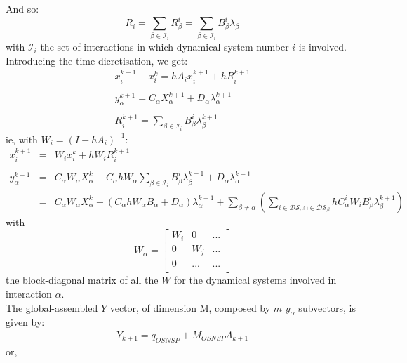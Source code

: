 \documentclass[10pt]{report}
\begin{document}
And so: 
\begin{equation}
R_i = \sum_{\beta\in\mathcal{I}_i}R_{\beta}^i=\sum_{\beta\in\mathcal{I}_i}B^i_{\beta} \lambda_{\beta}
\end{equation}
with $\mathcal{I}_i$ the set of interactions in which dynamical system number $i$ is involved. \\
Introducing the time dicretisation, we get: 
\begin{eqnarray}
x_i^{k+1}-x_i^k = h A_i x_i^{k+1} + h R_i^{k+1}  \\
\nonumber\\
y_{\alpha}^{k+1} = C_{\alpha}X_{\alpha}^{k+1} + D_{\alpha}\lambda_{\alpha}^{k+1}\\
\nonumber\\
R_i^{k+1} = \sum_{\beta\in\mathcal{I}_i}B^i_{\beta} \lambda_{\beta}^{k+1}
\end{eqnarray}
ie, with $W_i = (I-h A_i)^{-1}$: 
\begin{eqnarray}
x_i^{k+1}&=& W_i x_i^{k} + hW_i R_i^{k+1}  \\
\nonumber\\
y_{\alpha}^{k+1} &=& C_{\alpha}W_{\alpha} X_{\alpha}^{k} + C_{\alpha}hW_{\alpha}\sum_{\beta\in\mathcal{I}_i}B^i_{\beta} \lambda_{\beta}^{k+1} + D_{\alpha}\lambda_{\alpha}^{k+1} \\
&=& C_{\alpha}W_{\alpha} X_{\alpha}^{k} + (C_{\alpha}hW_{\alpha}B_{\alpha} + D_{\alpha}) \lambda_{\alpha}^{k+1} + \sum_{\beta\neq\alpha}(\sum_{i\in\mathcal{DS}_{\alpha}\cap\in\mathcal{DS}_{\beta}} hC_{\alpha}^iW_i B^i_{\beta} \lambda_{\beta}^{k+1})
\end{eqnarray}
with 
\begin{equation}\label{Walpha}
W_{\alpha}=\left[\begin{array}{ccc} 
W_i &  0   & ... \\
0   &  W_j & ...\\
0  & ... & ... \\ 
\end{array}\right]
\end{equation}
the block-diagonal matrix of all the $W$ for the dynamical systems involved in interaction $\alpha$.\\  
The global-assembled $Y$ vector, of dimension M, composed by $m$ $y_{\alpha}$ subvectors, is given by:
\begin{eqnarray}
Y_{k+1} = q_{OSNSP} + M_{OSNSP}\Lambda_{k+1}
\end{eqnarray}
or,
\end{document}
